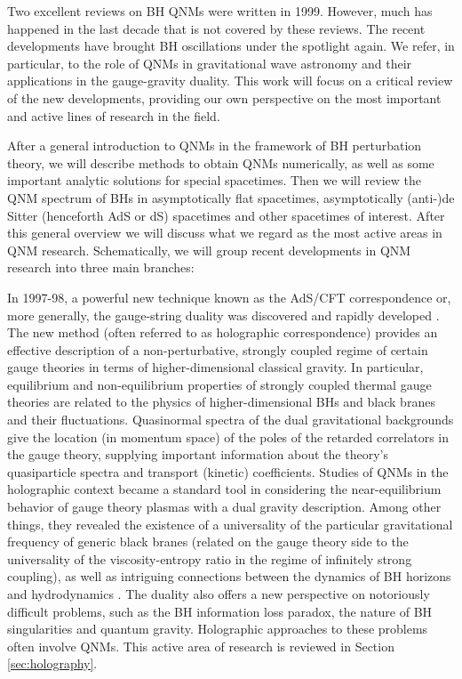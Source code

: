 \documentclass[]{iopart}
\begin{document}
Two excellent reviews on BH QNMs \cite{Kokkotas:1999bd,Nollert:1999ji} were
written in 1999. However, much has happened in the last decade that is not
covered by these reviews. The recent developments have brought BH oscillations
under the spotlight again.  We refer, in particular, to the role of QNMs in
gravitational wave astronomy and their applications in the gauge-gravity
duality.
%
This work will focus on a critical review of the new developments, providing
our own perspective on the most important and active lines of research in the
field.

After a general introduction to QNMs in the framework of BH perturbation
theory, we will describe methods to obtain QNMs numerically, as well as some
important analytic solutions for special spacetimes. Then we will review the
QNM spectrum of BHs in asymptotically flat spacetimes, asymptotically
(anti-)de Sitter (henceforth AdS or dS) spacetimes and other spacetimes of
interest. After this general overview we will discuss what we regard as the
most active areas in QNM research. Schematically, we will group recent
developments in QNM research into three main branches:

  In 1997-98, a powerful new
technique known as the AdS/CFT correspondence or, more generally, the
gauge-string duality was discovered and rapidly developed
\cite{Maldacena:1997re}.  The new method (often referred to as holographic
correspondence) provides an effective description of a non-perturbative,
strongly coupled regime of certain gauge theories in terms of
higher-dimensional classical gravity.  In particular, equilibrium and
non-equilibrium properties of strongly coupled thermal gauge theories are
related to the physics of higher-dimensional BHs and black branes and their
fluctuations.  Quasinormal spectra of the dual gravitational backgrounds give
the location (in momentum space) of the poles of the retarded correlators in
the gauge theory, supplying important information about the theory's
quasiparticle spectra and transport (kinetic) coefficients.  Studies of QNMs
in the holographic context became a standard tool in considering the
near-equilibrium behavior of gauge theory plasmas with a dual gravity
description.  Among other things, they revealed the existence of a
universality of the particular gravitational frequency of generic black branes
(related on the gauge theory side to the universality of the viscosity-entropy
ratio in the regime of infinitely strong coupling), as well as intriguing
connections between the dynamics of BH horizons and hydrodynamics
\cite{Son:2007vk}.  The duality also offers a new perspective on notoriously
difficult problems, such as the BH information loss paradox, the nature of BH
singularities and quantum gravity.  Holographic approaches to these problems
often involve QNMs.  This active area of research is reviewed in Section
\ref{sec:holography}.
\end{document}
